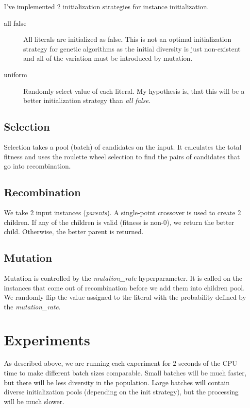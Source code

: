 \documentclass[a4paper,10pt]{article}
\begin{document}
I've implemented 2 initialization strategies for instance initialization.

\begin{description}
	\item[all false] All literals are initialized as false. This is not an optimal initialization strategy for genetic algorithms as the initial diversity is just non-existent and all of the variation must be introduced by mutation.
	\item[uniform] Randomly select value of each literal. My hypothesis is, that this will be a better initialization strategy than \emph{all false}.
\end{description}


\subsection{Selection}

Selection takes a pool (batch) of candidates on the input. It calculates the total fitness and uses the roulette wheel selection to find the pairs of candidates that go into recombination.

\subsection{Recombination}

We take 2 input instances (\emph{parents}). A single-point crossover is used to create 2 children. If any of the children is valid (fitness is non-0), we return the better child. Otherwise, the better parent is returned.

\subsection{Mutation}

Mutation is controlled by the \emph{mutation\_rate} hyperparameter. It is called on the instances that come out of recombination before we add them into children pool. We randomly flip the value assigned to the literal with the probability defined by the \emph{mutation\_rate}.

\section{Experiments}

As described above, we are running each experiment for $2$ seconds of the CPU time to make different batch sizes comparable. Small batches will be much faster, but there will be less diversity in the population. Large batches will contain diverse initialization pools (depending on the init strategy), but the processing will be much slower.
\end{document}
